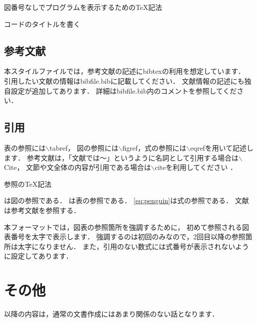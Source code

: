 \begin{lstbox}{図番号なしでプログラムを表示するためのTeX記法}
\begin{minilst}
\begin{lstbox}{コードのタイトルを書く}
\begin{minilst}
	<ここにソースコード>
\end{minilst｝
\end{lstbox}
\end{minilst}
\end{lstbox}
\subsection{参考文献}
\label{sec:bib}
本スタイルファイルでは，参考文献の記述にbibtexの利用を想定しています．
引用したい文献の情報はbibfile.bibに記載してください．
文献情報の記述にも独自設定が追加してあります．
詳細はbibfile.bib内のコメントを参照してください．
\subsection{引用}
\label{sec:ref}
表の参照には$\backslash$tabref，
図の参照には$\backslash$figref，式の参照には$\backslash$eqrefを用いて記述します．
参考文献は，「文献\Cite{test2}では～」というように名詞として引用する場合は$\backslash$Cite，
文節や文全体の内容が引用である場合は$\backslash$citeを利用してください
\cite{test1}\cite{test3}．

\begin{lstbox}{参照のTeX記法}
\begin{minilst}
は図の参照である．
は表の参照である．
\eqref{eq:penguin}は式の参照である．
文献\Cite{penguin}は参考文献を参照する\cite{penguin}．
\end{minilst}
\end{lstbox}

本フォーマットでは，図表の参照箇所を強調するために，
初めて参照される図表番号を太字で表示します．
強調するのは初回のみなので，2回目以降の参照箇所は太字になりません．
また，引用のない数式には式番号が表示されないように設定してあります．

\section{その他}
以降の内容は，通常の文書作成にはあまり関係のない話となります．


\end{minilst}
\end{lstbox}
